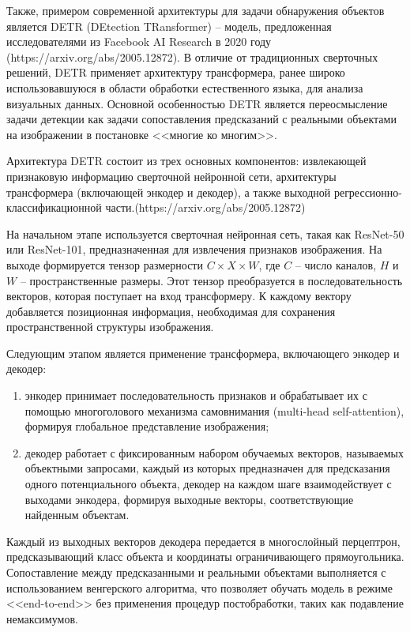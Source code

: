 Также, примером современной архитектуры для задачи обнаружения объектов является 
DETR (DEtection TRansformer) -- модель, предложенная исследователями из Facebook 
AI Research в 2020 году (https://arxiv.org/abs/2005.12872). В отличие от 
традиционных сверточных решений, DETR применяет архитектуру трансформера, ранее 
широко использовавшуюся в области обработки естественного языка, для анализа 
визуальных данных. Основной особенностью DETR является переосмысление задачи 
детекции как задачи сопоставления предсказаний с реальными объектами на 
изображении в постановке <<многие ко многим>>.

Архитектура DETR состоит из трех основных компонентов: извлекающей признаковую 
информацию сверточной нейронной сети, архитектуры трансформера (включающей 
энкодер и декодер), а также выходной регрессионно-классификационной части.(https://arxiv.org/abs/2005.12872)

На начальном этапе используется сверточная нейронная сеть, такая как ResNet-50 
или ResNet-101, предназначенная для извлечения признаков изображения. На выходе 
формируется тензор размерности $C \times X \times W$, где $C$ -- число каналов, 
$H$ и $W$ -- пространственные размеры. Этот тензор преобразуется в 
последовательность векторов, которая поступает на вход трансформеру. К каждому 
вектору добавляется позиционная информация, необходимая для сохранения 
пространственной структуры изображения.

Следующим этапом является применение трансформера, включающего энкодер и декодер:

\begin{enumerate}
    \item энкодер принимает последовательность признаков и обрабатывает их с 
    помощью многоголового механизма самовнимания (multi-head self-attention), 
    формируя глобальное представление изображения;
    \item декодер работает с фиксированным набором обучаемых векторов, называемых 
    объектными запросами, каждый из которых предназначен для предсказания одного 
    потенциального объекта, декодер на каждом шаге взаимодействует с выходами 
    энкодера, формируя выходные векторы, соответствующие найденным объектам.
\end{enumerate}

Каждый из выходных векторов декодера передается в многослойный перцептрон, 
предсказывающий класс объекта и координаты ограничивающего прямоугольника. 
Сопоставление между предсказанными и реальными объектами выполняется с 
использованием венгерского алгоритма, что позволяет обучать модель в режиме 
<<end-to-end>> без применения процедур постобработки, таких как подавление 
немаксимумов.

